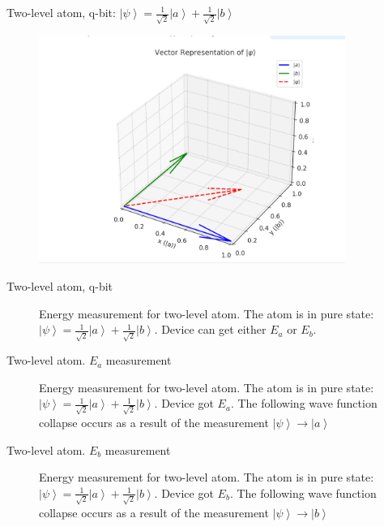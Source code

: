 \documentclass[10pt,pdf,hyperref={unicode}]{beamer}
\begin{document}
\begin{frame}{Two-level atom, q-bit: $\left|\psi\right> = 
  \frac{1}{\sqrt{2}}\left|a\right> + \frac{1}{\sqrt{2}}\left|b\right>$}

\begin{figure} 
  \includegraphics[width=100mm,scale=0.5]{VectorRepresent.png}
\end{figure}
\end{frame}


\begin{frame}{Two-level atom, q-bit}
\begin{figure}
\centering



\caption{Energy measurement for two-level atom. The atom is in pure
  state:  $\left|\psi\right> = 
  \frac{1}{\sqrt{2}}\left|a\right> + \frac{1}{\sqrt{2}}\left|b\right>$.
  Device can get either $E_a$ or $E_b$.
}
\end{figure}
\end{frame}


\begin{frame}{Two-level atom. $E_a$ measurement}
\begin{figure}
\centering



\caption{Energy measurement for two-level atom. The atom is in pure
  state: $\left|\psi\right> = 
  \frac{1}{\sqrt{2}}\left|a\right> + \frac{1}{\sqrt{2}}\left|b\right>$.
  Device got $E_a$. The following wave function collapse occurs as a
  result of the measurement $\left|\psi\right> \to \left|a\right>$
}
\label{fig:add:mesure_ex_a}
\end{figure}
\end{frame}

\begin{frame}{Two-level atom. $E_b$ measurement}
\begin{figure}
\centering



\caption{Energy measurement for two-level atom. The atom is in pure
  state: $\left|\psi\right> = 
\frac{1}{\sqrt{2}}\left|a\right> + \frac{1}{\sqrt{2}}\left|b\right>$.
Device got $E_b$. The following wave function collapse occurs as a
  result of the measurement $\left|\psi\right> \to \left|b\right>$
}
\label{fig:add:mesure_ex_b}
\end{figure}
\end{frame}
\end{document}
